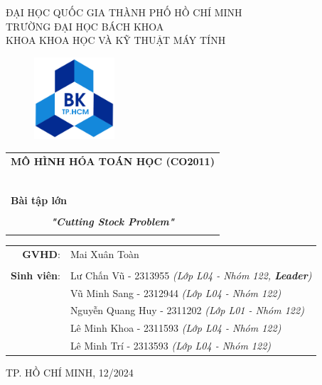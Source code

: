 \documentclass[a4paper]{article}
\begin{document}
\begin{titlepage}
\begin{center}
ĐẠI HỌC QUỐC GIA THÀNH PHỐ HỒ CHÍ MINH\\
TRƯỜNG ĐẠI HỌC BÁCH KHOA\\
KHOA KHOA HỌC VÀ KỸ THUẬT MÁY TÍNH\\
\end{center}

\vspace{1cm}

\begin{figure}[h!]
\begin{center}
\includegraphics[width=3cm]{hcmut.png}
\end{center}
\end{figure}

\vspace{1cm}


\begin{center}
\begin{tabular}{c}
\multicolumn{1}{c}{\textbf{{\Large MÔ HÌNH HÓA TOÁN HỌC (CO2011)}}}\\
~~\\
\hline
\\
\multicolumn{1}{l}{\textbf{{\Large Bài tập lớn}}}\\
\\
\textbf{\textit{{\Huge "Cutting Stock Problem"}}}\\
\\
\hline
\end{tabular}
\end{center}

\vspace{2cm}

\begin{table}[h]
\centering
    \begin{tabular}{rl}
    \hspace{3 cm}\textbf{GVHD}:
    & Mai Xuân Toàn\\

    & \\[10pt]
\textbf{Sinh viên}: & Lư Chấn Vũ - 2313955 \emph{(Lớp L04 - Nhóm 122, \textbf{Leader})} \\
& Vũ Minh Sang - 2312944 \emph{(Lớp L04 - Nhóm 122)} \\
& Nguyễn Quang Huy - 2311202 \emph{(Lớp L01 - Nhóm 122)} \\
& Lê Minh Khoa - 2311593 \emph{(Lớp L04 - Nhóm 122)} \\
& Lê Minh Trí - 2313593 \emph{(Lớp L04 - Nhóm 122)} \\
    \end{tabular}
\end{table}

\begin{center}
{\footnotesize TP. HỒ CHÍ MINH, 12/2024}
\end{center}
\end{titlepage}
\end{document}
